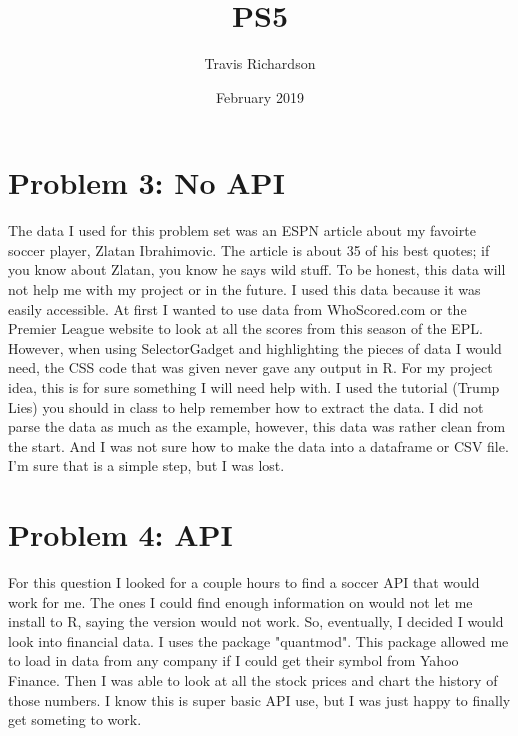 \documentclass{article}
\title{PS5}
\author{Travis Richardson }
\date{February 2019}
\begin{document}
\maketitle

\section{Problem 3: No API}
The data I used for this problem set was an ESPN article about my favoirte soccer player, Zlatan Ibrahimovic. The article is about 35 of his best quotes; if you know about Zlatan, you know he says wild stuff. To be honest, this data will not help me with my project or in the future. I used this data because it was easily accessible. At first I wanted to use data from WhoScored.com or the Premier League website to look at all the scores from this season of the EPL. However, when using SelectorGadget and highlighting the pieces of data I would need, the CSS code that was given never gave any output in R. For my project idea, this is for sure something I will need help with. I used the tutorial (Trump Lies) you should in class to help remember how to extract the data. I did not parse the data as much as the example, however, this data was rather clean from the start. And I was not sure how to make the data into a dataframe or CSV file. I'm sure that is a simple step, but I was lost.



\section{Problem 4: API}
For this question I looked for a couple hours to find a soccer API that would work for me. The ones I could find enough information on would not let me install to R, saying the version would not work. So, eventually, I decided I would look into financial data. I uses the package "quantmod". This package allowed me to load in data from any company if I could get their symbol from Yahoo Finance. Then I was able to look at all the stock prices and chart the history of those numbers. I know this is super basic API use, but I was just happy to finally get someting to work.  
\end{document}
